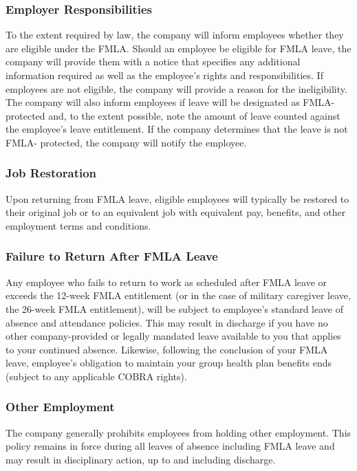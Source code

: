 \subsubsection{Employer Responsibilities}

To the extent required by law, the company will inform employees whether they are eligible under the FMLA. Should an employee be eligible for FMLA leave, the company will provide them with a notice that specifies any additional information required as well as the employee's rights and responsibilities. If employees are not eligible, the company will provide a reason for the ineligibility. The company will also inform employees if leave will be designated as FMLA-protected and, to the extent possible, note the amount of leave counted against the employee's leave entitlement. If the company determines that the leave is not FMLA- protected, the company will notify the employee.

\subsubsection{Job Restoration}

Upon returning from FMLA leave, eligible employees will typically be restored to their original job or to an equivalent job with equivalent pay, benefits, and other employment terms and conditions.

\subsubsection{Failure to Return After FMLA Leave}

Any employee who fails to return to work as scheduled after FMLA leave or exceeds the 12-week FMLA entitlement (or in the case of military caregiver leave, the 26-week FMLA entitlement), will be subject to employee's standard leave of absence and attendance policies. This may result in discharge if you have no other company-provided or legally mandated leave available to you that applies to your continued absence. Likewise, following the conclusion of your FMLA leave, employee's obligation to maintain your group health plan benefits ends (subject to any applicable COBRA rights).

\subsubsection{Other Employment}

The company generally prohibits employees from holding other employment. This policy remains in force during all leaves of absence including FMLA leave and may result in disciplinary action, up to and including discharge.

